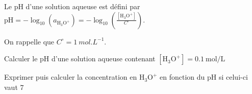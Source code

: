 
\hauteurLargeurCadreReponse		{7mm}{2cm}
\initialisationEntrainement

\debutEntrainement

Le pH d'une solution aqueuse est défini par $\textrm{pH}=-\log_{10}\left(a_{\textrm{H}_3\textrm{O}^+}\right)=-\log_{10}\left(\frac{[\textrm{H}_3\textrm{O}^+]}{C^{\circ}}\right)$. 

On rappelle que $C^{\circ} = \SI{1}{mol.L^{-1}}$.


\begin{enonce}
Calculer le \textrm{pH} d'une solution aqueuse contenant $[\textrm{H}_3\textrm{O}^+]=\SI{0,1}{\mol\per\liter}$
\end{enonce}




\begin{enonce}
Exprimer puis calculer la concentration en $\textrm{H}_3\textrm{O}^+$ en fonction du \textrm{pH} si celui-ci vaut $7$
\end{enonce}



